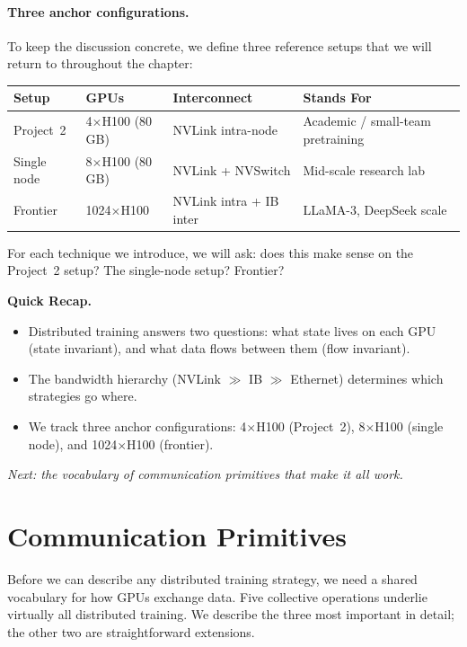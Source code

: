 \paragraph{Three anchor configurations.} To keep the discussion concrete, we define three reference setups that we will return to throughout the chapter:

\begin{center}
\begin{tabularx}{\textwidth}{@{}lllX@{}}
\toprule
\textbf{Setup} & \textbf{GPUs} & \textbf{Interconnect} & \textbf{Stands For} \\
\midrule
Project~2 & 4$\times$H100 (80\,GB) & NVLink intra-node & Academic / small-team pretraining \\
Single node & 8$\times$H100 (80\,GB) & NVLink + NVSwitch & Mid-scale research lab \\
Frontier & 1024$\times$H100 & NVLink intra + IB inter & LLaMA-3, DeepSeek scale \\
\bottomrule
\end{tabularx}
\end{center}

For each technique we introduce, we will ask: does this make sense on the Project~2 setup? The single-node setup? Frontier?


\begin{quickrecap}
\textbf{Quick Recap.}
\begin{itemize}[nosep,leftmargin=1.5em]
  \item Distributed training answers two questions: what state lives on each GPU (state invariant), and what data flows between them (flow invariant).
  \item The bandwidth hierarchy (NVLink $\gg$ IB $\gg$ Ethernet) determines which strategies go where.
  \item We track three anchor configurations: 4$\times$H100 (Project~2), 8$\times$H100 (single node), and 1024$\times$H100 (frontier).
\end{itemize}
\textit{Next: the vocabulary of communication primitives that make it all work.}
\end{quickrecap}


\section{Communication Primitives}
\label{sec:comm-primitives}

Before we can describe any distributed training strategy, we need a shared vocabulary for how GPUs exchange data. Five collective operations underlie virtually all distributed training. We describe the three most important in detail; the other two are straightforward extensions.

